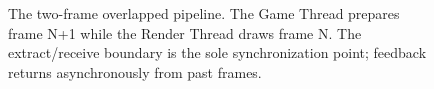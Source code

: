 \begin{figure}[!tb]
\caption{The two-frame overlapped pipeline. The Game Thread prepares frame N+1 while the Render Thread draws frame N. The extract/receive boundary is the sole synchronization point; feedback returns asynchronously from past frames.}
\label{fig:overlapped-pipeline}
\end{figure}
\FloatBarrier
